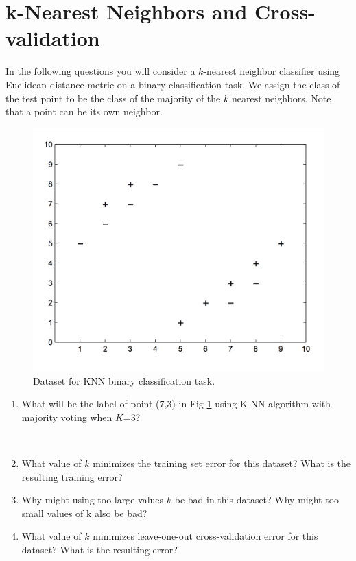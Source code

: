 \documentclass[11pt]{article}
\begin{document}
\section{k-Nearest Neighbors and Cross-validation }
In the following questions you will consider a $k$-nearest neighbor classifier using Euclidean
distance metric on a binary classification task. 
We assign the class of the test point to be the
class of the majority of the $k$ nearest neighbors. 
Note that a point can be its own neighbor.
\begin{figure}[h]
    \centering
    \includegraphics[scale=0.45]{knn_figure.png}
    \caption{Dataset for KNN binary classification task.}
    \label{fig:knn}
\end{figure}

\begin{enumerate}

    \item {} What will be the label of point (7,3) in Fig \ref{fig:knn} using K-NN algorithm with majority voting when $K$=3?

\\
\solution{}

    \item {} What value of $k$ minimizes the training set error for this dataset? What is
the resulting training error?

\solution{}

    \item {} Why might using too large values $k$ be bad in this dataset? Why might too
small values of k also be bad?

\solution{}

    \item {} What value of $k$ minimizes leave-one-out cross-validation error for this
dataset? What is the resulting error?

\solution{}
\end{enumerate}


\end{document}

